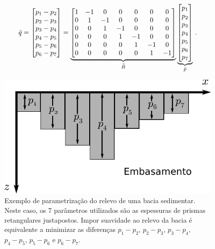 \begin{equation}
\bar{q} =
    \begin{bmatrix}
    p_1 - p_2 \\ p_2 - p_3 \\ p_3 - p_4 \\ p_4 - p_5 \\ p_5 - p_6 \\ p_6 - p_7
    \end{bmatrix}
    =
    \underbrace{
    \begin{bmatrix}
    1 & -1 & 0 & 0 & 0 & 0 & 0\\
    0 & 1 & -1 & 0 & 0 & 0 & 0\\    
    0 & 0 & 1 & -1 & 0 & 0 & 0\\    
    0 & 0 & 0 & 1 & -1 & 0 & 0\\    
    0 & 0 & 0 & 0 & 1 & -1 & 0\\    
    0 & 0 & 0 & 0 & 0 & 1 & -1\\    
    \end{bmatrix}}_{\bar{\bar{R}}}    
    \underbrace{
    \begin{bmatrix}
    p_1 \\ p_2 \\ p_3 \\ p_4 \\ p_5 \\ p_6 \\ p_7
    \end{bmatrix}}_{\bar{p}}    
     \thinspace .
\end{equation}

\begin{figure}
    \centering
    \includegraphics[scale=1]{figs/basin-smoothness}
    \caption{Exemplo de parametrização do relevo de uma bacia sedimentar.
    Neste caso, os 7 parâmetros utilizados são as espessuras de prismas
    retangulares justapostos. Impor suavidade ao relevo da bacia é equivalente
    a minimizar as diferenças $p_1 - p_2$, $p_2 - p_3$, $p_3 - p_4$, $p_4 - p_5$,
    $p_5 - p_6$ e $p_6 - p_7$.}
    \label{fig:basin-smoothness}
\end{figure}

